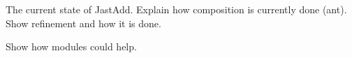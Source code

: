 The current state of JastAdd. Explain how composition is currently done (ant).
Show refinement and how it is done. 

Show how modules could help.